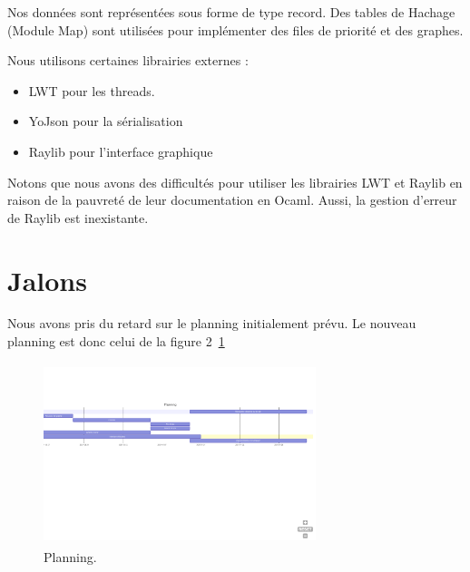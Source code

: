 \documentclass{article}
\begin{document}
\newpage

Nos données sont représentées sous forme de type record. Des tables de Hachage (Module Map) sont utilisées pour implémenter des files de priorité et des graphes.

Nous utilisons certaines librairies externes :

\begin{itemize}
\item LWT pour les threads.
\item YoJson pour la sérialisation
\item Raylib pour l'interface graphique
\end{itemize}

Notons que nous avons des difficultés pour utiliser les librairies LWT et Raylib en raison de la pauvreté de leur documentation en Ocaml. Aussi, la gestion d'erreur de Raylib est inexistante.

\section{Jalons}
Nous avons pris du retard sur le planning initialement prévu. Le nouveau planning est donc celui de la figure 2~\ref{fig:planning}

\begin{figure}
\label{fig:planning}
\hrulefill
\begin{center}
\includegraphics[height=200px,width=300px]{planning}
\end{center}
\caption{Planning.}
\hrulefill
\end{figure}

\newpage
\end{document}
